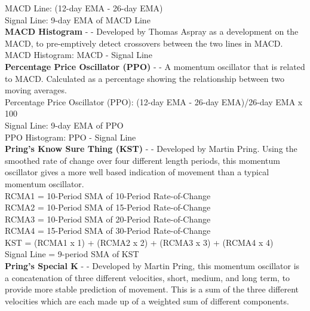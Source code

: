 \documentclass[conference]{IEEEtran}
\begin{document}
\noindent
MACD Line: (12-day EMA - 26-day EMA)\\
Signal Line: 9-day EMA of MACD Line\\

\iffalse
[]
\fi

\noindent
\textbf{MACD Histogram} - \cite{Murphy1999} - Developed by Thomas Aspray as a development on the MACD, to pre-emptively detect crossovers between the two lines in MACD.\\

\noindent
MACD Histogram: MACD - Signal Line \\

\iffalse
[]
\fi

\noindent
\textbf{Percentage Price Oscillator (PPO)} - \cite{Murphy1999} - A momentum oscillator that is related to MACD. Calculated as a percentage showing the relationship between two moving averages. \\

\noindent
Percentage Price Oscillator (PPO): {(12-day EMA - 26-day EMA)/26-day EMA} x 100 \\
Signal Line: 9-day EMA of PPO \\
PPO Histogram: PPO - Signal Line \\

\iffalse
[]
\fi

\noindent
\textbf{Pring's Know Sure Thing (KST)} - \cite{Pring2002} - Developed by Martin Pring. Using the smoothed rate of change over four different length periods, this momentum oscillator gives a more well based indication of movement than a typical momentum oscillator. \\

\noindent
RCMA1 = 10-Period SMA of 10-Period Rate-of-Change \\
RCMA2 = 10-Period SMA of 15-Period Rate-of-Change \\
RCMA3 = 10-Period SMA of 20-Period Rate-of-Change \\
RCMA4 = 15-Period SMA of 30-Period Rate-of-Change \\
KST = (RCMA1 x 1) + (RCMA2 x 2) + (RCMA3 x 3) + (RCMA4 x 4) \\
Signal Line = 9-period SMA of KST \\

\iffalse
[]
\fi

\noindent
\textbf{Pring's Special K} - \cite{Pring2002} - Developed by Martin Pring, this momentum oscillator is a concatenation of three different velocities, short, medium, and long term, to provide more stable prediction of movement. This is a sum of the three different velocities which are each made up of a weighted sum of different components.\\
\end{document}
